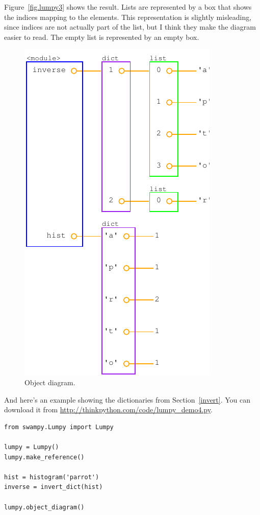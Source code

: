 \documentclass[10pt]{book}
\begin{document}
Figure~\ref{fig.lumpy3} shows the result.  Lists are represented by
a box that shows the indices mapping to the elements.  This representation
is slightly misleading, since indices are not actually
part of the list, but I think they make the diagram easier to
read.  The empty list is represented by an empty box.

\begin{figure}
\centerline
{\includegraphics[scale=0.7]{figs/lumpydemo4.pdf}}
\caption{Object diagram.}
\label{fig.lumpy4}
\end{figure}

And here's an example
showing the dictionaries from Section~\ref{invert}.  You can download
it from \url{http://thinkpython.com/code/lumpy_demo4.py}.

\begin{verbatim}
from swampy.Lumpy import Lumpy

lumpy = Lumpy()
lumpy.make_reference()

hist = histogram('parrot')
inverse = invert_dict(hist)

lumpy.object_diagram()
\end{verbatim}
\end{document}
